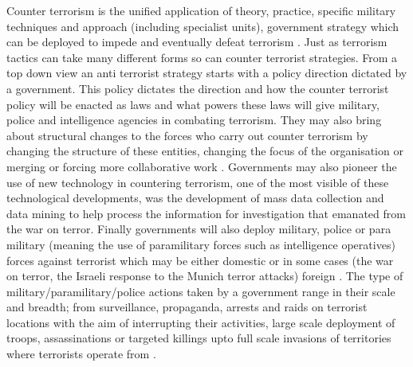 Counter terrorism is the unified application of theory, practice, specific military techniques and approach (including specialist units), government strategy which can be deployed to impede and eventually defeat terrorism \citep{jackson2005writing}. Just as terrorism tactics can take many different forms so can counter terrorist strategies. From a top down view an anti terrorist strategy starts with a policy direction dictated by a government. This policy dictates the direction and how the counter terrorist policy will be enacted as laws and what powers these laws will give military, police and intelligence agencies in combating terrorism. They may also bring about structural changes to the forces who carry out counter terrorism by changing the structure of these entities, changing the focus of the organisation or merging or forcing more collaborative work \citep{amwal2003counter}. Governments may also pioneer the use of  new technology in countering terrorism, one of the most visible of these technological developments, was the development of mass data collection and data mining to help process the information for investigation that emanated from the war on terror. Finally governments will also deploy military, police or para military (meaning the use of paramilitary forces such as intelligence operatives) forces against terrorist which may be either domestic or in some cases (the war on terror, the Israeli response to the Munich terror attacks) foreign \citep{calahan1995countering}. The type of military/paramilitary/police actions taken by a government range in their scale and breadth; from surveillance, propaganda, arrests and raids on terrorist locations with the aim of interrupting their activities, large scale deployment of troops, assassinations or targeted killings upto full scale invasions of territories where terrorists operate from \citep{conetta2002strange}. 
\\
